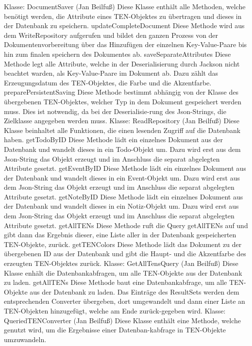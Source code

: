 Klasse: DocumentSaver (Jan Beilfuß)
Diese Klasse enthält alle Methoden, welche benötigt werden, die Attribute eines TEN-Objektes zu übertragen und dieses in der Datenbank zu speichern.
updateCompleteDocument
Diese Methode wird aus dem WriteRepository aufgerufen und bildet den ganzen Prozess von der Dokumentenvorbereitung über das Hinzufügen der einzelnen Key-Value-Paare bis hin zum finalen speichern des Dokumentes ab.
saveSeparateAttributes
Diese Methode legt alle Attribute, welche in der Deserialisierung durch Jackson nicht beachtet warden, als Key-Value-Paare im Dokument ab. Dazu zählt das Erzeugungsdatum des TEN-Objektes, die Farbe und die Akzentfarbe.
preparePersistentSaving
Diese Methode bestimmt abhängig von der Klasse des übergebenen TEN-Objektes, welcher Typ in dem Dokument gespeichert werden muss. Dies ist notwendig, da bei der Deserialisie-rung des Json-Strings, die Zielklasse angegeben werden muss.
Klasse: ReadRepository (Jan Beilfuß)
Diese Klasse beinhaltet alle Funktionen, die einen lesenden Zugriff auf die Datenbank haben.
getTodoByID
Diese Methode lädt ein einzelnes Dokument aus der Datenbank und wandelt dieses in ein Todo-Objekt um. Dazu wird erst aus dem Json-String das Objekt erzeugt und im Anschluss die separat abgelegten Attribute gesetzt.
getEventByID
Diese Methode lädt ein einzelnes Dokument aus der Datenbank und wandelt dieses in ein Event-Objekt um. Dazu wird erst aus dem Json-String das Objekt erzeugt und im Anschluss die separat abgelegten Attribute gesetzt.
getNoteByID
Diese Methode lädt ein einzelnes Dokument aus der Datenbank und wandelt dieses in ein Notiz-Objekt um. Dazu wird erst aus dem Json-String das Objekt erzeugt und im Anschluss die separat abgelegten Attribute gesetzt.
getAllTENs
Diese Methode ruft die Query getAllTENs auf und gibt dann das Ergebnis dieser, eine Liste aller in der Datenbank gespeicherten TEN-Objekte, zurück.
getTENColors
Diese Methode lädt das Dokument zu der übergebenen ID aus der Datenbank und gibt die Haupt- und die Akzentfarbe des erzeugten TEN-Objektes zurück.
Klasse: GetAllTensQuery (Jan Beilfuß)
Diese Klasse enhält die Datenbankabfragen, um alle TEN-Objekte aus der Datenbank zu laden.
getAllTENs
Diese Methode baut eine Datenbankabfrage, um alle TEN-Objekte aus der Datenbank zu laden. Das Einträge des ResultSets werden dem entsprechenden Converter übergeben, dort umgewandelt und dann einer Liste an TEN-Objekten hinzugefügt, welche am Ende zurück-gegeben wird.
Klasse: QueriedTENConverter (Jan Beilfuß)
Diese Klasse enthält eine Methode, welche genutzt wird, um die Ergebnisse einer Datenban-kabfrage in TEN-Objekte umzuwandeln.
